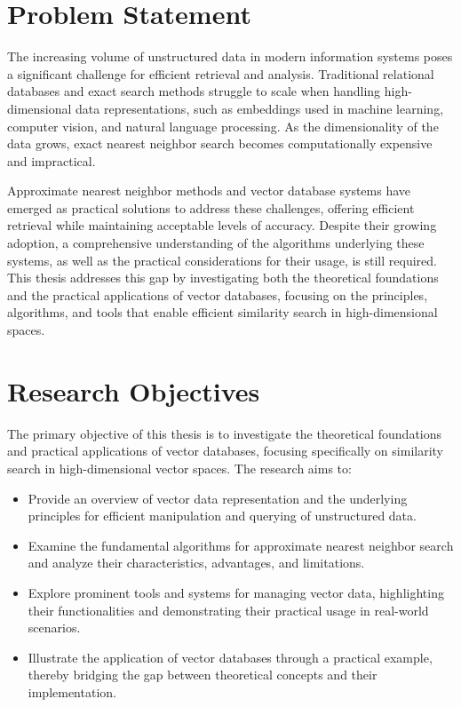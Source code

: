 \newpage

\section{Problem Statement}

The increasing volume of unstructured data in modern information systems poses a significant challenge for efficient retrieval and analysis. Traditional relational databases and exact search methods struggle to scale when handling high-dimensional data representations, such as embeddings used in machine learning, computer vision, and natural language processing. As the dimensionality of the data grows, exact nearest neighbor search becomes computationally expensive and impractical.

Approximate nearest neighbor methods and vector database systems have emerged as practical solutions to address these challenges, offering efficient retrieval while maintaining acceptable levels of accuracy. Despite their growing adoption, a comprehensive understanding of the algorithms underlying these systems, as well as the practical considerations for their usage, is still required. This thesis addresses this gap by investigating both the theoretical foundations and the practical applications of vector databases, focusing on the principles, algorithms, and tools that enable efficient similarity search in high-dimensional spaces.

\section{Research Objectives}

The primary objective of this thesis is to investigate the theoretical foundations and practical applications of vector databases, focusing specifically on similarity search in high-dimensional vector spaces. The research aims to:

\begin{itemize}
    \item Provide an overview of vector data representation and the underlying principles for efficient manipulation and querying of unstructured data.
    \item Examine the fundamental algorithms for approximate nearest neighbor search and analyze their characteristics, advantages, and limitations.
    \item Explore prominent tools and systems for managing vector data, highlighting their functionalities and demonstrating their practical usage in real-world scenarios.
    \item Illustrate the application of vector databases through a practical example, thereby bridging the gap between theoretical concepts and their implementation.
\end{itemize}


